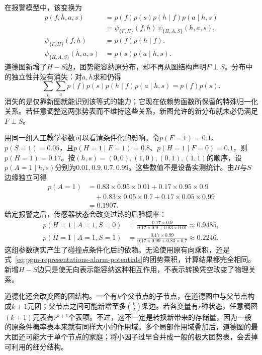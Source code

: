 在报警模型中，该变换为
\begin{equation}
  \begin{aligned}
    p(f,h,a,s)&=p(f)p(s)p(h\mid f)p(a\mid h,s)\\
    &=\psi_{\{F,H\}}(f,h)\,
      \psi_{\{H,A,S\}}(h,a,s),\\
    \psi_{\{F,H\}}(f,h)&=p(f)p(h\mid f),\\
    \psi_{\{H,A,S\}}(h,a,s)&=p(s)p(a\mid h,s).
  \end{aligned}
  \label{eq:pgm-representations-alarm-potentials}
\end{equation}
道德图新增了$H-S$边，团势能容纳原分布，却不再从图结构声明$F\perp S$。分布中的独立性并没有消失：对$a,h$求和仍得
\[
  \sum_h\sum_a p(f)p(s)p(h\mid f)p(a\mid h,s)
  =p(f)p(s).
\]
消失的是仅靠新图就能识别该等式的能力；它现在依赖势函数所保留的特殊归一化关系。若任意调整这两张势表而不维持这些关系，新图允许的新分布就未必仍满足$F\perp S$。

用同一组人工教学参数可以看清条件化的影响。令$p(F=1)=0.1$、$p(S=1)=0.05$，且$p(H=1\mid F=1)=0.8$、$p(H=1\mid F=0)=0.1$，则$p(H=1)=0.17$。按$(h,s)=(0,0),(1,0),(0,1),(1,1)$的顺序，设$p(A=1\mid h,s)$分别为$0.01,0.9,0.7,0.99$。这些数值不是设备实测统计。由$H$与$S$边缘独立可得
\[
  \begin{aligned}
    p(A=1)
    &=0.83\times0.95\times0.01
      +0.17\times0.95\times0.9\\
    &\quad+0.83\times0.05\times0.7
      +0.17\times0.05\times0.99\\
    &=0.1907.
  \end{aligned}
\]
给定报警之后，传感器状态会改变过热的后验概率：
\begin{equation}
  \begin{aligned}
    p(H=1\mid A=1,S=0)
    &=\frac{0.17\times0.9}
    {0.17\times0.9+0.83\times0.01}
    \approx0.9485,\\
    p(H=1\mid A=1,S=1)
    &=\frac{0.17\times0.99}
    {0.17\times0.99+0.83\times0.7}
    \approx0.2246.
  \end{aligned}
  \label{eq:pgm-representations-alarm-posteriors}
\end{equation}
这组参数确实产生了碰撞点条件化后的依赖。无论使用原有向乘积，还是式~\eqref{eq:pgm-representations-alarm-potentials}的团势乘积，计算结果都完全相同。新增$H-S$边只是使无向表示能容纳这种相互作用，不表示转换凭空改变了物理关系。

道德化还会改变图的团结构。一个有$k$个父节点的子节点，在道德图中与父节点构成$k+1$元团；父节点之间可能新增至多$\binom{k}{2}$条边。若各变量有$r$种状态，任意稠密$(k+1)$元表有$r^{k+1}$个表项。不过，这不一定是转换新带来的存储量，因为一般的原条件概率表本来就有同样大小的作用域。多个局部作用域叠加后，道德图的最大团还可能大于单个节点的家庭；将小因子过早合并成一般的极大团势表，会丢掉可利用的细分结构。

